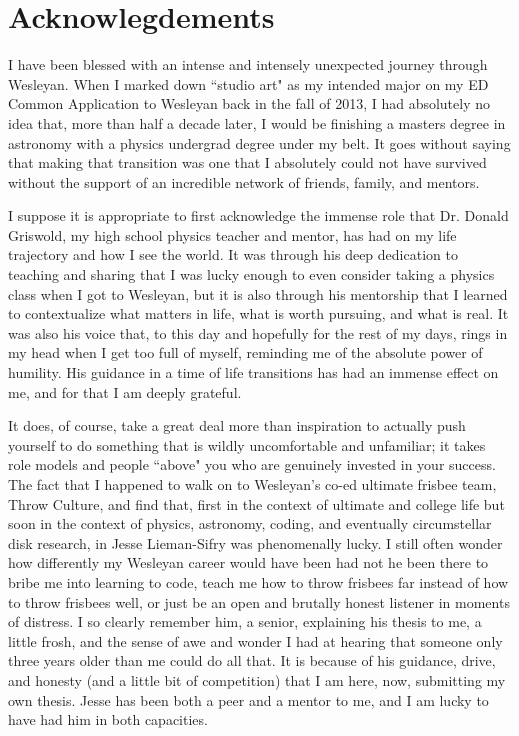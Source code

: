 \chapter{Acknowlegdements}

I have been blessed with an intense and intensely unexpected journey through Wesleyan. When I marked down ``studio art" as my intended major on my ED Common Application to Wesleyan back in the fall of 2013, I had absolutely no idea that, more than half a decade later, I would be finishing a masters degree in astronomy with a physics undergrad degree under my belt. It goes without saying that making that transition was one that I absolutely could not have survived without the support of an incredible network of friends, family, and mentors.

I suppose it is appropriate to first acknowledge the immense role that Dr. Donald Griswold, my high school physics teacher and mentor, has had on my life trajectory and how I see the world. It was through his deep dedication to teaching and sharing that I was lucky enough to even consider taking a physics class when I got to Wesleyan, but it is also through his mentorship that I learned to contextualize what matters in life, what is worth pursuing, and what is real. It was also his voice that, to this day and hopefully for the rest of my days, rings in my head when I get too full of myself, reminding me of the absolute power of humility. His guidance in a time of life transitions has had an immense effect on me, and for that I am deeply grateful.


It does, of course, take a great deal more than inspiration to actually push yourself to do something that is wildly uncomfortable and unfamiliar; it takes role models and people ``above" you who are genuinely invested in your success. The fact that I happened to walk on to Wesleyan's co-ed ultimate frisbee team, Throw Culture, and find that, first in the context of ultimate and college life but soon in the context of physics, astronomy, coding, and eventually circumstellar disk research, in Jesse Lieman-Sifry was phenomenally lucky. I still often wonder how differently my Wesleyan career would have been had not he been there to bribe me into learning to code, teach me how to throw frisbees far instead of how to throw frisbees well, or just be an open and brutally honest listener in moments of distress. I so clearly remember him, a senior, explaining his thesis to me, a little frosh, and the sense of awe and wonder I had at hearing that someone only three years older than me could do all that. It is because of his guidance, drive, and honesty (and a little bit of competition) that I am here, now, submitting my own thesis. Jesse has been both a peer and a mentor to me, and I am lucky to have had him in both capacities.


